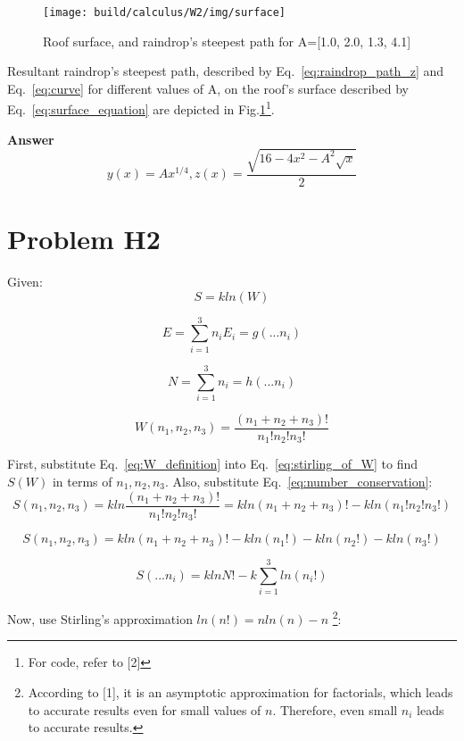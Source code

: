 \documentclass{article}
\begin{document}
\begin{figure}[H]
  \centering
  \texttt{[image: build/calculus/W2/img/surface]}
  \caption{Roof surface, and raindrop's steepest path for A=[1.0, 2.0, 1.3, 4.1]}
  \label{fig:surface}  
\end{figure}

Resultant raindrop's steepest path, described by Eq.~\eqref{eq:raindrop_path_z} and Eq.~\eqref{eq:curve} for different values of A, on the roof's surface described by Eq.~\eqref{eq:surface_equation} are depicted in Fig.\ref{fig:surface}\footnote{For code, refer to [2]}.

\hfill \break
\textbf{Answer}
\begin{equation*}
  y(x) = Ax^{1/4}, z(x) = \frac{\sqrt{16 - 4x^2 - A^2\sqrt{x}}}{2}
\end{equation*}

\section{ Problem H2 }

Given:
\begin{equation} \label{eq:stirling_of_W}
  S = kln(W)
\end{equation}

\begin{equation} \label{eq:energy_conservation}
  E = \sum_{i=1}^{3}{n_iE_i} = g(...n_i) 
\end{equation}

\begin{equation} \label{eq:number_conservation}
  N = \sum_{i=1}^{3}{n_i} = h(...n_i)
\end{equation}

\begin{equation} \label{eq:W_definition}
  W(n_1, n_2, n_3) = \frac{(n_1 + n_2 + n_3)!}{n_1!n_2!n_3!}
\end{equation}

First, substitute Eq.~\eqref{eq:W_definition} into Eq.~\eqref{eq:stirling_of_W} to find $S(W)$ in terms of $n_1, n_2, n_3$. Also, substitute Eq.~\eqref{eq:number_conservation}:
\[
  S(n_1, n_2, n_3) = kln \frac{(n_1 + n_2 + n_3)!}{n_1!n_2!n_3!} = kln (n_1 + n_2 + n_3)! - kln(n_1!n_2!n_3!)
\]

\[
  S(n_1, n_2, n_3) = kln(n_1 + n_2 + n_3)! - kln(n_1!) - kln(n_2!) - kln(n_3!)
\]

\[
  S(...n_i) = kln N! - k\sum_{i=1}^{3}{ln(n_i!)}
\]

Now, use Stirling's approximation $ln(n!) = nln(n) - n$ \footnote{According to [1], it is an asymptotic approximation for factorials, which leads to accurate results even for small values of $n$. Therefore, even small $n_i$ leads to accurate results.}:
\end{document}
